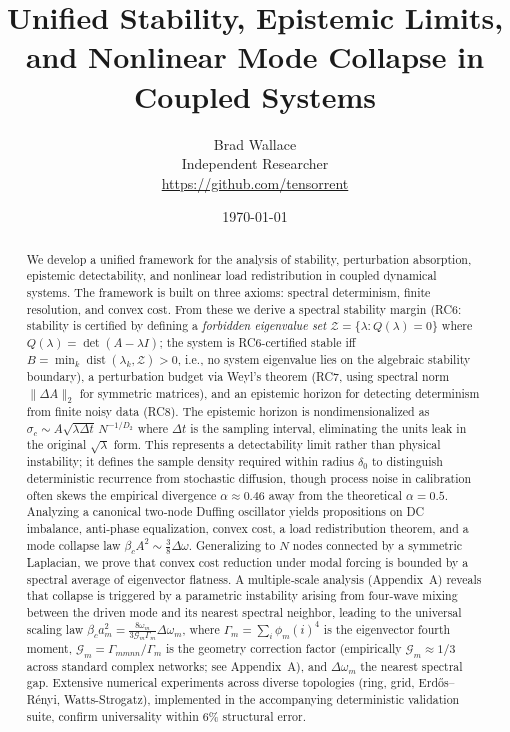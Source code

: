 \documentclass[11pt]{article}
\title{Unified Stability, Epistemic Limits, and Nonlinear Mode Collapse in Coupled Systems}
\author{Brad Wallace\\Independent Researcher\\\url{https://github.com/tensorrent}}
\date{\today}
\DeclareMathOperator{\dist}{dist}
\begin{document}
\maketitle

\begin{abstract}
We develop a unified framework for the analysis of stability, perturbation absorption,
epistemic detectability, and nonlinear load redistribution in coupled dynamical systems.
The framework is built on three axioms: spectral determinism, finite resolution, and convex cost.
From these we derive a spectral stability margin (RC6: stability is certified by defining a \emph{forbidden eigenvalue set} $\mathcal{Z} = \{\lambda : Q(\lambda) = 0\}$ where $Q(\lambda) = \det(A - \lambda I)$; the system is RC6-certified stable iff $B = \min_k \dist(\lambda_k, \mathcal{Z}) > 0$, i.e., no system eigenvalue lies on the algebraic stability boundary), a perturbation budget via Weyl's theorem (RC7, using spectral norm $\|\Delta A\|_2$ for symmetric matrices),
and an epistemic horizon for detecting determinism from finite noisy data (RC8). The epistemic horizon is nondimensionalized as $\sigma_c \sim A \sqrt{\lambda \Delta t}\, N^{-1/D_2}$ where $\Delta t$ is the sampling interval, eliminating the units leak in the original $\sqrt{\lambda}$ form. This represents a detectability limit rather than physical instability; it defines the sample density required within radius $\delta_0$ to distinguish deterministic recurrence from stochastic diffusion, though process noise in calibration often skews the empirical divergence $\alpha \approx 0.46$ away from the theoretical $\alpha=0.5$.
Analyzing a canonical two‑node Duffing oscillator yields propositions on DC imbalance,
anti‑phase equalization, convex cost, a load redistribution theorem, and a mode collapse law
\(\beta_c A^2 \sim \frac{3}{8}\Delta\omega\). Generalizing to \(N\) nodes connected by a symmetric Laplacian,
we prove that convex cost reduction under modal forcing is bounded by a spectral average of eigenvector flatness.
A multiple‑scale analysis (Appendix~A) reveals that collapse is triggered by a parametric instability
arising from four‑wave mixing between the driven mode and its nearest spectral neighbor,
leading to the universal scaling law \(\beta_c a_m^2 = \frac{8\omega_m}{3\mathcal{G}_m\Gamma_m}\Delta\omega_m\),
where \(\Gamma_m = \sum_i \phi_m(i)^4\) is the eigenvector fourth moment, \(\mathcal{G}_m = \Gamma_{mmnn}/\Gamma_m\) is the geometry correction factor (empirically \(\mathcal{G}_m \approx 1/3\) across standard complex networks; see Appendix~A),
and \(\Delta\omega_m\) the nearest spectral gap.
Extensive numerical experiments across diverse topologies (ring, grid, Erd\H{o}s--R\'enyi, Watts-Strogatz), implemented in the accompanying deterministic validation suite, confirm universality within 6\% structural error.


\end{abstract}
\end{document}
